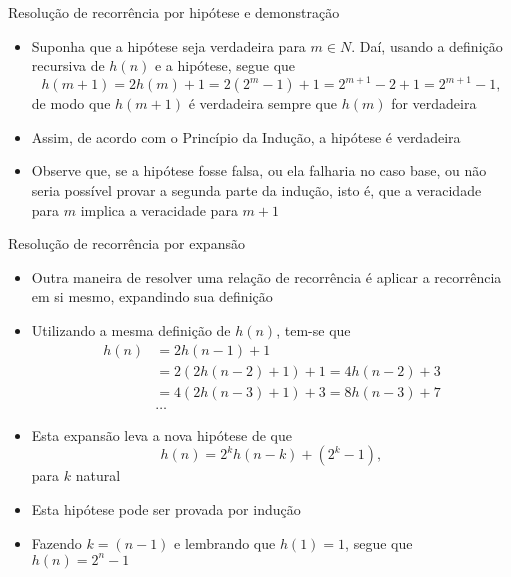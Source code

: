\begin{frame}[fragile]{Resolução de recorrência por hipótese e demonstração}

    \begin{itemize}
        \item Suponha que a hipótese seja verdadeira para $m\in N$. Daí, usando a definição
            recursiva de $h(n)$ e a hipótese, segue que
        \[
            h(m + 1) = 2h(m) + 1 = 2(2^m - 1) + 1 = 2^{m + 1} - 2 + 1 = 2^{m + 1} - 1,
        \]
        de modo que $h(m + 1)$ é verdadeira sempre que $h(m)$ for verdadeira

        \item Assim, de acordo com o Princípio da Indução, a hipótese é verdadeira

        \item Observe que, se a hipótese fosse falsa, ou ela falharia no caso base, ou não
            seria possível provar a segunda parte da indução, isto é, que a veracidade para
            $m$ implica a veracidade para $m + 1$
    \end{itemize}

\end{frame}

\begin{frame}[fragile]{Resolução de recorrência por expansão}

    \begin{itemize}
        \item Outra maneira de resolver uma relação de recorrência é aplicar a
            recorrência em si mesmo, expandindo sua definição

        \item Utilizando a mesma definição de $h(n)$, tem-se que
        \begin{align*}
            h(n) &= 2h(n - 1) + 1 \\
            &= 2(2h(n - 2) + 1) + 1 = 4h(n - 2) + 3\\
            &= 4(2h(n - 3) + 1) + 3 = 8h(n - 3) + 7\\
            &\ldots
        \end{align*}

        \item Esta expansão leva a nova hipótese de que
        \[
            h(n) = 2^kh(n - k) + (2^k - 1),
        \]
        para $k$ natural

        \item Esta hipótese pode ser provada por indução

        \item Fazendo $k = (n - 1)$ e lembrando que $h(1) = 1$, segue que $h(n) = 2^n - 1$
    \end{itemize}

\end{frame}
